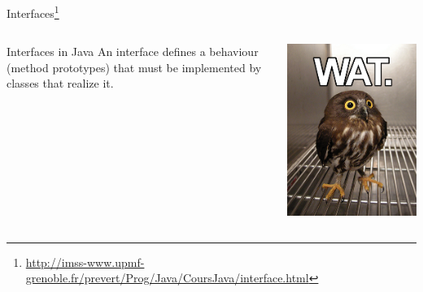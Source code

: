 \documentclass[English,c,%
hyperref={%
    pdftitle={FISA-DE2 Java Inheritance},%
    pdfauthor={Muller, Gravier, Laforest, Subercaze},%
    pdfsubject={Java Inheritance},%
    pdfkeywords={Inheritance, Java},%
    colorlinks=true,%
    urlcolor=blue,%
    linkcolor=%
    },%
xcolor={pdftex,svgnames} %
]{beamer}
\begin{document}
\begin{frame}{Interfaces\footnote{\url{http://imss-www.upmf-grenoble.fr/prevert/Prog/Java/CoursJava/interface.html}}}

 \begin{columns}[t]
  \begin{column}{.55\linewidth}
  \begin{block}{Interfaces in Java}
    An interface defines a behaviour (method prototypes) that must be
    implemented by classes that realize it.
  \end{block}
  \end{column}

  \begin{column}{.40\linewidth}
    \begin{block}{}
      \includegraphics[height=0.6\textheight]{./images01/wat.png}
    \end{block}
  \end{column}
 \end{columns}

\end{frame}
\end{document}
